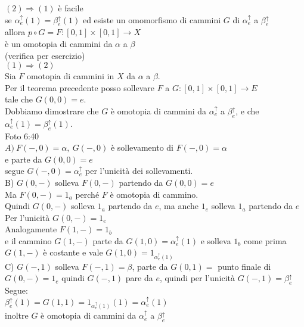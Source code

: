 \documentclass[12px]{article}
\begin{document}
\begin{dimo}
	$(2) \Rightarrow  (1)$ è facile\\
	se $\alpha^\uparrow_e(1) = \beta^\uparrow_e(1)$  ed esiste un omomorfismo di cammini $G$ di $\alpha^\uparrow_e$ a $\beta^\uparrow_e$\\
	allora  $p\circ G = F: [0,1]\times[0,1] \rightarrow X$\\
	è un omotopia di cammini da $\alpha$ a $\beta$\\
	(verifica per esercizio)\\
	 $(1) \Rightarrow (2)$\\
	 Sia $F$ omotopia di cammini in $X$ da $\alpha$ a $\beta$.\\
	 Per il teorema precedente posso sollevare $F$ a  $G : [0,1]\times [0,1] \rightarrow E$\\
	 tale che $G(0,0) = e.$\\
	 Dobbiamo dimostrare che $G$ è omotopia di cammini da $\alpha_e^\uparrow$ a  $\beta_e^\uparrow$, e che  $\alpha_e^\uparrow(1) = \beta^\uparrow_e(1)$. \\
	 Foto 6:40\\
	 $A)\ F(-,0) = \alpha, \ G(-,0)$ è sollevamento di  $F(-,0) = \alpha$\\
	 e parte da  $G(0,0) = e$\\
	 segue  $G(-,0) = \alpha^\uparrow_e$ per l'unicità dei sollevamenti.\\
	 B) $G(0,-)$ solleva $F(0,-)$ partendo da  $G(0,0) = e$\\
	 Ma  $F(0,-) = 1_a$ perché  $F$ è omotopia di cammino.\\
	 Quindi $G(0,-)$ solleva  $1_a$ partendo da  $e$, ma anche  $1_e$ solleva  $1_a $ partendo da  $e$ \\
	 Per l'unicità $G(0,-) = 1_e$\\
	 Analogamente $F(1,-) = 1_b$\\
	 e il cammino  $G(1,-)$ parte da  $G(1,0) = \alpha^\uparrow_e(1)$ e solleva  $1_b$ come prima  $G(1,-)$ è costante e vale $G(1,0) = 1_{\alpha^\uparrow_e(1)}$\\
	 C)  $G(-,1)$ solleva  $F(-,1) = \beta$, parte da  $G(0,1)= $ punto finale di $G(0,-)=1_e$ quindi  $G(-,1)$ pare da  $e$, quindi per l'unicità  $G(-,1) = \beta^\uparrow_e$\\
	 Segue:\\
	 $\beta_e^\uparrow (1) = G(1,1) = 1_{\alpha^\uparrow_e(1)}(1)= \alpha_e^\uparrow(1)$\\
	 inoltre  $G$ è omotopia di cammini da $\alpha^\uparrow_e$ a  $\beta^\uparrow_e$
\end{dimo}
\end{document}
